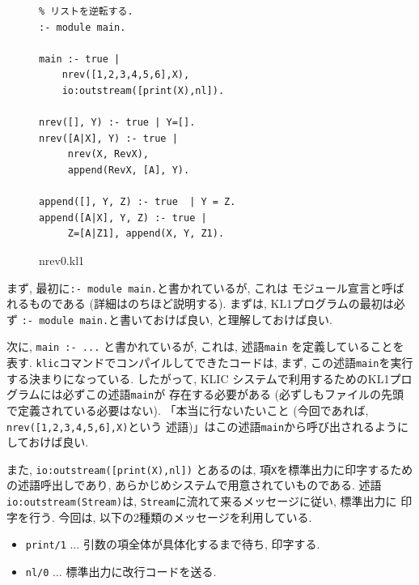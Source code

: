 \documentclass[a4,titlepage]{jsreport}
\begin{document}
\begin{figure}[htbp]
\begin{center}
\leavevmode
\begin{minipage}{12.5cm}
\begin{Verbatim}[frame=single,baselinestretch=0.8]
% nrev0.kl1
% リストを逆転する.  
:- module main.

main :- true |
    nrev([1,2,3,4,5,6],X),
    io:outstream([print(X),nl]).

nrev([], Y) :- true | Y=[].
nrev([A|X], Y) :- true |
     nrev(X, RevX),
     append(RevX, [A], Y).

append([], Y, Z) :- true  | Y = Z.
append([A|X], Y, Z) :- true |
     Z=[A|Z1], append(X, Y, Z1).
\end{Verbatim}
\end{minipage}
\end{center}
\caption{nrev0.kl1}
\label{fig:nrev0}
\end{figure}

まず, 最初に\verb|:- module main.|と書かれているが, これは
モジュール宣言と呼ばれるものである (詳細はのちほど説明する).  まずは, 
KL1プログラムの最初は必ず
\verb|:- module main.|と書いておけば良い, と理解しておけば良い.  

次に, \verb|main :- ...| と書かれているが, これは, 述語\verb|main|
を定義していることを表す.  
\verb|klic|コマンドでコンパイルしてできたコードは, 
まず, この述語\verb|main|を実行する決まりになっている.  したがって, KLIC
システムで利用するためのKL1プログラムには必ずこの述語\verb|main|が
存在する必要がある (必ずしもファイルの先頭で定義されている必要はない).  
「本当に行ないたいこと (今回であれば, \verb|nrev([1,2,3,4,5,6],X)|という
述語)」はこの述語\verb|main|から呼び出されるようにしておけば良い.  

また, \verb|io:outstream([print(X),nl])| とあるのは, 
項\verb|X|を標準出力に印字するための述語呼出しであり, 
あらかじめシステムで用意されていものである.  
述語\verb|io:outstream(Stream)|は, 
\verb|Stream|に流れて来るメッセージに従い, 標準出力に
印字を行う.  
今回は, 以下の2種類のメッセージを利用している.  

\begin{itemize}
\item \verb|print/1| $\ldots$ 引数の項全体が具体化するまで待ち, 
印字する.  

\item \verb|nl/0| $\ldots$ 標準出力に改行コードを送る.  
\end{itemize}
\end{document}

